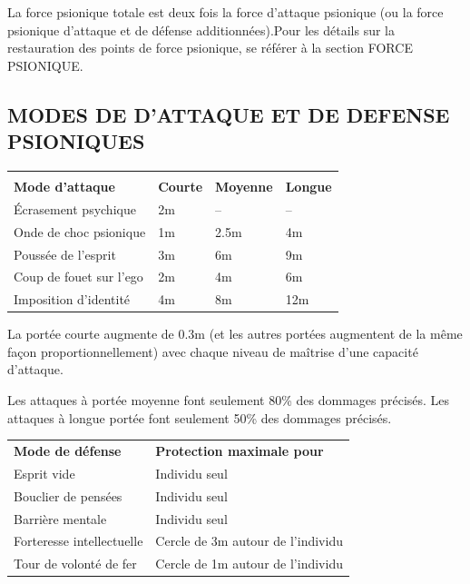 \documentclass[11pt]{article}
\begin{document}
{\bigskip

La force psionique totale est deux fois la force d'attaque psionique (ou la force psionique d'attaque et de défense additionnées).Pour les détails sur la restauration des points de force psionique, se référer à la section FORCE PSIONIQUE. %

\subsection*{\normalsize MODES DE D'ATTAQUE ET DE DEFENSE PSIONIQUES}

\begin{tabular}{p{5cm} >{\centering\arraybackslash}p{2.5cm}>{\centering\arraybackslash}p{2.5cm}>{\centering\arraybackslash}p{2.5cm}}
&\multicolumn{3}{c}{\textbf{Portée}} \\
\textbf{Mode d'attaque} & \textbf{Courte} & \textbf{Moyenne} & \textbf{Longue} \\
Écrasement psychique & 2m & -- & -- \\
Onde de choc psionique & 1m & 2.5m & 4m \\
Poussée de l'esprit & 3m & 6m & 9m \\
Coup de fouet sur l'ego & 2m & 4m & 6m \\
Imposition d'identité & 4m & 8m & 12m \\
\end{tabular}

\medskip

La portée courte augmente de 0.3m (et les autres portées augmentent de la même façon proportionnellement) avec chaque niveau de maîtrise d'une capacité d'attaque.

\medskip

Les attaques à portée moyenne font seulement 80\% des dommages précisés. Les attaques à longue portée font seulement 50\% des dommages précisés.

\bigskip

\begin{tabular}{p{7.5cm}p{6cm}}
\textbf{Mode de défense} & \textbf{Protection maximale pour} \\
Esprit vide & Individu seul \\
Bouclier de pensées & Individu seul \\
Barrière mentale & Individu seul \\
Forteresse intellectuelle & Cercle de 3m autour de l'individu \\
Tour de volonté de fer & Cercle de 1m autour de l'individu \\
\end{tabular}

}
\end{document}

